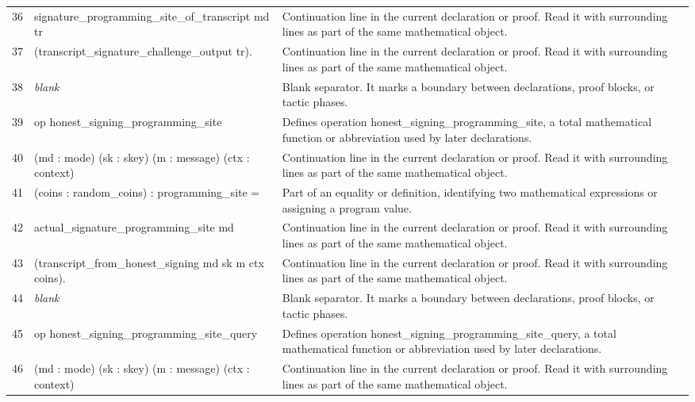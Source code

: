 \documentclass[10pt]{article}
\begin{document}
\begin{longtable}{r L{0.53\textwidth} L{0.37\textwidth}}
36 & {\ttfamily\scriptsize   signature\_programming\_site\_of\_transcript md tr} & Continuation line in the current declaration or proof.  Read it with surrounding lines as part of the same mathematical object. \\
37 & {\ttfamily\scriptsize     (transcript\_signature\_challenge\_output tr).} & Continuation line in the current declaration or proof.  Read it with surrounding lines as part of the same mathematical object. \\
38 & {\ttfamily\scriptsize \emph{blank}} & Blank separator.  It marks a boundary between declarations, proof blocks, or tactic phases. \\
39 & {\ttfamily\scriptsize op honest\_signing\_programming\_site} & Defines operation honest\_signing\_programming\_site, a total mathematical function or abbreviation used by later declarations. \\
40 & {\ttfamily\scriptsize    (md : mode) (sk : skey) (m : message) (ctx : context)} & Continuation line in the current declaration or proof.  Read it with surrounding lines as part of the same mathematical object. \\
41 & {\ttfamily\scriptsize    (coins : random\_coins) : programming\_site =} & Part of an equality or definition, identifying two mathematical expressions or assigning a program value. \\
42 & {\ttfamily\scriptsize   actual\_signature\_programming\_site md} & Continuation line in the current declaration or proof.  Read it with surrounding lines as part of the same mathematical object. \\
43 & {\ttfamily\scriptsize     (transcript\_from\_honest\_signing md sk m ctx coins).} & Continuation line in the current declaration or proof.  Read it with surrounding lines as part of the same mathematical object. \\
44 & {\ttfamily\scriptsize \emph{blank}} & Blank separator.  It marks a boundary between declarations, proof blocks, or tactic phases. \\
45 & {\ttfamily\scriptsize op honest\_signing\_programming\_site\_query} & Defines operation honest\_signing\_programming\_site\_query, a total mathematical function or abbreviation used by later declarations. \\
46 & {\ttfamily\scriptsize    (md : mode) (sk : skey) (m : message) (ctx : context)} & Continuation line in the current declaration or proof.  Read it with surrounding lines as part of the same mathematical object. \\

\end{longtable}
\end{document}

